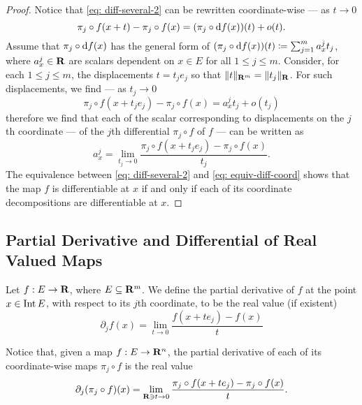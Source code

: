 \begin{proof}
    Notice that \cref{eq: diff-several-2} can be rewritten coordinate-wise --- as
    \(t \to 0\)
    \begin{equation}\label{eq: equiv-diff-coord}
        \pi_j \circ f(x + t) - \pi_j \circ f(x)
        = (\pi_j \circ \mathrm{d} f(x))(t) + o(t).
    \end{equation}
    Assume that \(\pi_j \circ \mathrm{d} f(x)\) has the general form of \((\pi_j \circ
    \mathrm{d} f(x))(t) \coloneq \sum_{j=1}^m a_x^j t_j\), where \(a_x^j \in \mathbf{R}\) are scalars
    dependent on \(x \in E\) for all \(1 \leq j \leq m\). Consider, for each \(1
    \leq j \leq m\), the displacements \(t = t_j e_j\) so that \(\lVert t\rVert_{\mathbf{R}^m} =
    \lVert t_j\rVert_{\mathbf{R}}\). For such displacements, we find --- as \(t_j \to 0\)
    \[
        \pi_j \circ f(x + t_j e_j) - \pi_j \circ f(x) = a_x^j t_j + o(t_j)
    \]
    therefore we find that each of the scalar corresponding to displacements on
    the \(j\)th coordinate --- of the \(j\)th differential \(\pi_j \circ f\) of
    \(f\) --- can be written as
    \begin{equation}\label{eq: partial-deriv-initial}
        a_x^j = \lim_{t_j \to 0} \frac{\pi_j \circ f(x + t_j e_j) - \pi_j \circ
            f(x)} {t_j}.
    \end{equation}
    The equivalence between \cref{eq: diff-several-2} and \cref{eq:
        equiv-diff-coord} shows that the map \(f\) is differentiable at \(x\) if and
    only if each of its coordinate decompositions are differentiable at \(x\).
\end{proof}

\subsection{Partial Derivative and Differential of Real Valued Maps}

\begin{definition}\label{def: partial derivative}
    Let \(f: E \to \mathbf{R}\), where \(E \subseteq \mathbf{R}^m\). We define the partial
    derivative of \(f\) at the point \(x \in \operatorname{Int} E\), with respect to its \(j\)th
    coordinate, to be the real value (if existent)
    \[
        \partial_j f(x) = \lim_{t \to 0} \frac{f(x + t e_j) - f(x)}{t}
    \]
\end{definition}

Notice that, given a map \(f: E \to \mathbf{R}^n\), the partial derivative of each of
its coordinate-wise maps \(\pi_j \circ f\) is the real value
\[
    \partial_j (\pi_j \circ f)(x) = \lim_{\mathbf{R} \ni t \to 0} \frac{\pi_j \circ f(x
        + t e_j) - \pi_j \circ f(x)}{t}.
\]

